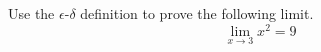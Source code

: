 Use the $\epsilon$-$\delta$ definition to prove the following limit.
\begin{equation*}
\lim_{x\rightarrow 3} x^2 = 9
\end{equation*}
